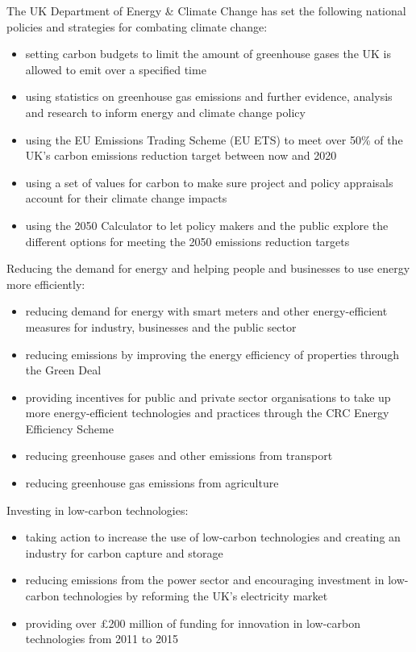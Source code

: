 The UK Department of Energy \& Climate Change has set the following national policies and strategies for combating climate change:
\begin{itemize}
	\item setting carbon budgets to limit the amount of greenhouse gases the UK is allowed to emit over a specified time
	\item using statistics on greenhouse gas emissions and further evidence, analysis and research to inform energy and climate change policy
	\item using the EU Emissions Trading Scheme (EU ETS) to meet over 50\% of the UK's carbon emissions reduction target between now and 2020
	\item using a set of values for carbon to make sure project and policy appraisals account for their climate change impacts
	\item using the 2050 Calculator to let policy makers and the public explore the different options for meeting the 2050 emissions reduction targets 
\end{itemize}



Reducing the demand for energy and helping people and businesses to use energy more efficiently:
\begin{itemize}
	\item reducing demand for energy with smart meters and other energy-efficient measures for industry, businesses and the public sector
	\item reducing emissions by improving the energy efficiency of properties through the Green Deal
	\item providing incentives for public and private sector organisations to take up more energy-efficient technologies and practices through the CRC Energy Efficiency Scheme 
	\item reducing greenhouse gases and other emissions from transport
	\item reducing greenhouse gas emissions from agriculture
\end{itemize}



Investing in low-carbon technologies:
\begin{itemize}
	\item taking action to increase the use of low-carbon technologies and creating an industry for carbon capture and storage
	\item reducing emissions from the power sector and encouraging investment in low-carbon technologies by reforming the UK’s electricity market
	\item providing over £200 million of funding for innovation in low-carbon technologies from 2011 to 2015
\end{itemize}



